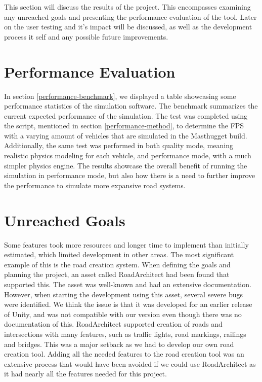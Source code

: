 
This section will discuss the results of the project. This encompasses examining any unreached goals and presenting the performance evaluation of the tool. Later on the user testing and it's impact will be discussed, as well as the development process it self and any possible future improvements.

\section{Performance Evaluation}
    In section \ref{performance-benchmark}, we displayed a table showcasing some performance statistics of the simulation software. The benchmark summarizes the current expected performance of the simulation. The test was completed using the script, mentioned in section \ref{performance-method}, to determine the FPS with a varying amount of vehicles that are simulated in the Masthugget build. Additionally, the same test was performed in both quality mode, meaning realistic physics modeling for each vehicle, and performance mode, with a much simpler physics engine. The results showcase the overall benefit of running the simulation in performance mode, but also how there is a need to further improve the performance to simulate more expansive road systems.

\section{Unreached Goals}
    Some features took more resources and longer time to implement than initially estimated, which limited development in other areas. The most significant example of this is the road creation system. When defining the goals and planning the project, an asset called RoadArchitect had been found that supported this\cite{road-architect}. The asset was well-known and had an extensive documentation. However, when starting the development using this asset, several severe bugs were identified. We think the issue is that it was developed for an earlier release of Unity, and was not compatible with our version even though there was no documentation of this. RoadArchitect supported creation of roads and intersections with many features, such as traffic lights, road markings, railings and bridges. This was a major setback as we had to develop our own road creation tool. Adding all the needed features to the road creation tool was an extensive process that would have been avoided if we could use RoadArchitect as it had nearly all the features needed for this project.

